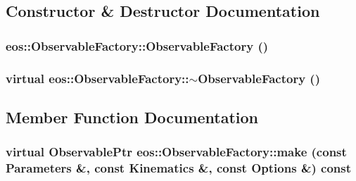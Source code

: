 \subsection{Constructor \& Destructor Documentation}
\hypertarget{classeos_1_1ObservableFactory_a74df47eaecec916d669606974695d6d9}{
\subsubsection[{ObservableFactory}]{\setlength{\rightskip}{0pt plus 5cm}eos::ObservableFactory::ObservableFactory ()}}
\label{classeos_1_1ObservableFactory_a74df47eaecec916d669606974695d6d9}
\hypertarget{classeos_1_1ObservableFactory_ae4f3c0da09a9d556b42ffe2d57d24c82}{
\subsubsection[{$\sim$ObservableFactory}]{\setlength{\rightskip}{0pt plus 5cm}virtual eos::ObservableFactory::$\sim$ObservableFactory ()}}
\label{classeos_1_1ObservableFactory_ae4f3c0da09a9d556b42ffe2d57d24c82}


\subsection{Member Function Documentation}
\hypertarget{classeos_1_1ObservableFactory_ac338d98049d8db85548aab9d3c74bcda}{
\subsubsection[{make}]{\setlength{\rightskip}{0pt plus 5cm}virtual {\bf ObservablePtr} eos::ObservableFactory::make (const {\bf Parameters} \&, \/  const {\bf Kinematics} \&, \/  const {\bf Options} \&) const}}
\label{classeos_1_1ObservableFactory_ac338d98049d8db85548aab9d3c74bcda}


